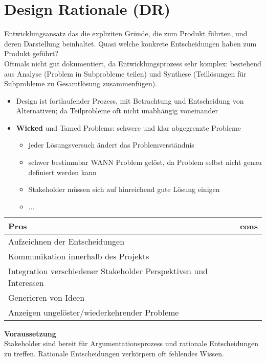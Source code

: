 \section{Design Rationale (DR)}
Entwicklungsansatz das die expliziten Gründe, die zum Produkt führten, und deren Darstellung beinhaltet. Quasi welche konkrete Entscheidungen haben zum Produkt geführt?\\
Oftmals nicht gut dokumentiert, da Entwicklungsprozess sehr komplex: bestehend aus Analyse (Problem in Subprobleme teilen) und Synthese (Teillösungen für Subprobleme zu Gesamtlösung zusammenfügen).

\begin{itemize}
	\item Design ist fortlaufender Prozess, mit Betrachtung und Entscheidung von Alternativen; da Teilprobleme oft nicht unabhängig voneinander
	\item \textbf{Wicked} und Tamed Problems: schwere und klar abgegrenzte Probleme
	\begin{itemize}
		\item jeder Lösungsversuch ändert das Problemverständnis
		\item schwer bestimmbar WANN Problem gelöst, da Problem selbst nicht genau definiert werden kann
		\item Stakeholder müssen sich auf hinreichend gute Lösung einigen
		\item $\ldots$
	\end{itemize}
	
\end{itemize}

\begin{table}[h]
	\begin{tabular}{|p{20em}|p{20em}|}
		\hline
		Pros	& cons\\
		\hline
		Aufzeichnen der Entscheidungen & \\
		Kommunikation innerhalb des Projekts & \\
		Integration verschiedener Stakeholder Perspektiven und Interessen & \\
		Generieren von Ideen & \\
		Anzeigen ungelöster/wiederkehrender Probleme & \\
		
	\end{tabular}
\end{table}

\textbf{Voraussetzung}\\
Stakeholder sind bereit für Argumentationsprozess und rationale Entscheidungen zu treffen. Rationale Entscheidungen verkörpern oft fehlendes Wissen.


